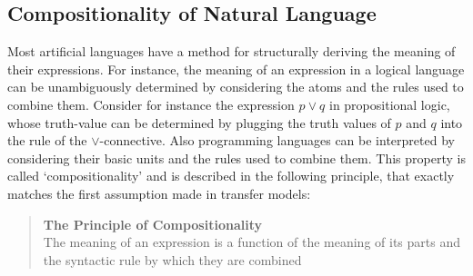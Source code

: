 \documentclass[a4paper, 11pt]{report}
\theoremstyle{definition}
\theoremstyle{plain}
\begin{document}
\subsection{Compositionality of Natural Language}

Most artificial languages have a method for structurally deriving the meaning of their expressions. For instance, the meaning of an expression in a logical language can be unambiguously determined by considering the atoms and the rules used to combine them. Consider for instance the expression $p\lor q$ in propositional logic, whose truth-value can be determined by plugging the truth values of $p$ and $q$ into the rule of the $\lor$-connective. Also programming languages can be interpreted by considering their basic units and the rules used to combine them. This property is called `compositionality' and is described in the following principle, that exactly matches the first assumption made in transfer models:

\begin{quote}
\textbf{The Principle of Compositionality}\\
The meaning of an expression is a function of the meaning of its parts and the syntactic rule by which they are combined \citep{partee1984compositionality}
\end{quote}
\end{document}
